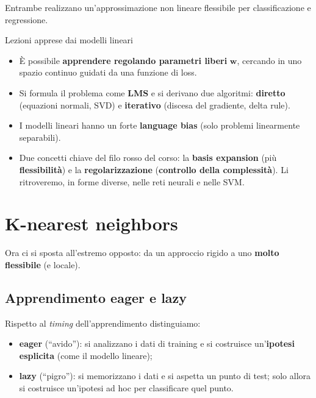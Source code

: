Entrambe realizzano un'approssimazione non lineare flessibile per
classificazione e regressione.

\begin{boxabstract}{Lezioni apprese dai modelli lineari}

\begin{itemize}
\tightlist
\item
  È possibile \textbf{apprendere regolando parametri liberi}
  \(\mathbf{w}\), cercando in uno spazio continuo guidati da una
  funzione di loss.
\item
  Si formula il problema come \textbf{LMS} e si derivano due algoritmi:
  \textbf{diretto} (equazioni normali, SVD) e \textbf{iterativo}
  (discesa del gradiente, delta rule).
\item
  I modelli lineari hanno un forte \textbf{language bias} (solo problemi
  linearmente separabili).
\item
  Due concetti chiave del filo rosso del corso: la \textbf{basis
  expansion} (più \textbf{flessibilità}) e la \textbf{regolarizzazione}
  (\textbf{controllo della complessità}). Li ritroveremo, in forme
  diverse, nelle reti neurali e nelle SVM.
\end{itemize}

\end{boxabstract}

\section{K-nearest neighbors}\label{k-nearest-neighbors}

Ora ci si sposta all'estremo opposto: da un approccio rigido a uno
\textbf{molto flessibile} (e locale).

\subsection{Apprendimento eager e
lazy}\label{apprendimento-eager-e-lazy}

Rispetto al \emph{timing} dell'apprendimento distinguiamo:

\begin{itemize}
\tightlist
\item
  \textbf{eager} (``avido''): si analizzano i dati di training e si
  costruisce un'\textbf{ipotesi esplicita} (come il modello lineare);
\item
  \textbf{lazy} (``pigro''): si memorizzano i dati e si aspetta un punto
  di test; solo allora si costruisce un'ipotesi ad hoc per classificare
  quel punto.
\end{itemize}

